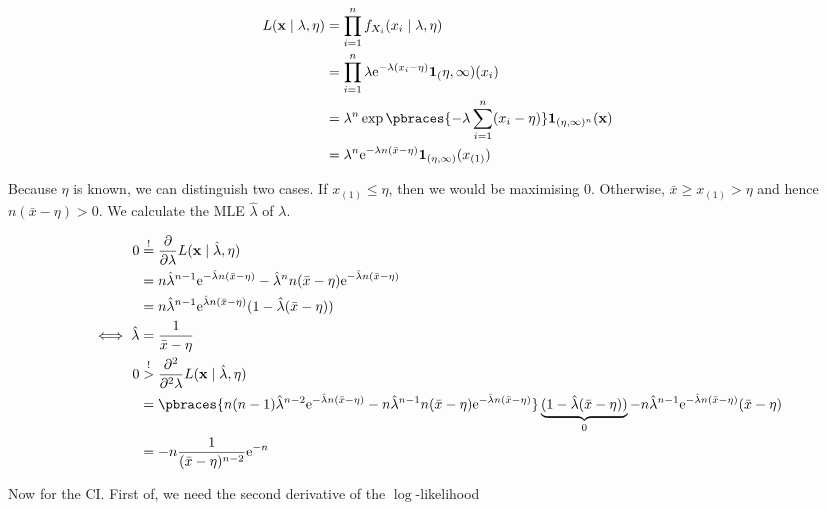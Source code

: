 \begin{solution}

\begin{align*}
    L(\mathbf x \mid \lambda, \eta)
    & =
    \prod_{i=1}^n
        f_{X_i}(x_i \mid \lambda, \eta) \\
    & =
    \prod_{i=1}^n
        \lambda
        \mathrm e^{-\lambda (x_i - \eta)}
        \mathbf 1_(\eta, \infty)(x_i) \\
    & =
    \lambda^n
    \exp
    \pbraces
    {
        -\lambda
        \sum_{i=1}^n
            (x_i - \eta)
    }
    \mathbf 1_{(\eta, \infty)^n}(\mathbf x) \\
    & =
    \lambda^n
    \mathrm e^{-\lambda n (\bar x - \eta)}
    \mathbf 1_{(\eta, \infty)}(x_{(1)})
\end{align*}

Because $\eta$ is known, we can distinguish two cases.
If $x_{(1)} \leq \eta$, then we would be maximising $0$.
Otherwise, $\bar x \geq x_{(1)} > \eta$ and hence $n (\bar x - \eta) > 0$.
We calculate the MLE $\hat \lambda$ of $\lambda$.

\begin{align*}
    0
    & \stackrel{!}{=}
    \frac{\partial}{\partial \lambda}
        L(\mathbf x \mid \hat \lambda, \eta) \\
    & =
    n \hat \lambda^{n-1} \mathrm e^{-\hat \lambda n (\bar x - \eta)}
    -
    \hat \lambda^n n (\bar x - \eta) \mathrm e^{-\hat \lambda n (\bar x - \eta)} \\
    & =
    n \hat \lambda^{n-1} \mathrm e^{\hat \lambda n (\bar x - \eta)} (1 - \hat \lambda (\bar x - \eta)) \\
    \iff
    \hat \lambda & = \frac{1}{\bar x - \eta} \\
    0
    & \stackrel{!}{>}
    \frac{\partial^2}{\partial^2 \lambda}
        L(\mathbf x \mid \hat \lambda, \eta) \\
    & =
    \pbraces
    {
        n (n - 1) \hat \lambda^{n-2} \mathrm e^{-\hat \lambda n (\bar x - \eta)}
        -
        n \hat \lambda^{n-1} n (\bar x - \eta) \mathrm e^{-\hat \lambda n (\bar x - \eta)}
    }
    \underbrace{(1 - \hat \lambda (\bar x - \eta))}_0
    -
    n \hat \lambda^{n-1} \mathrm e^{-\hat \lambda n (\bar x - \eta)} (\bar x - \eta) \\
    & =
    -n \frac{1}{(\bar x - \eta)^{n-2}} \mathrm e^{-n}
\end{align*}

Now for the CI.
First of, we need the second derivative of the $\log$-likelihood


\end{solution}
